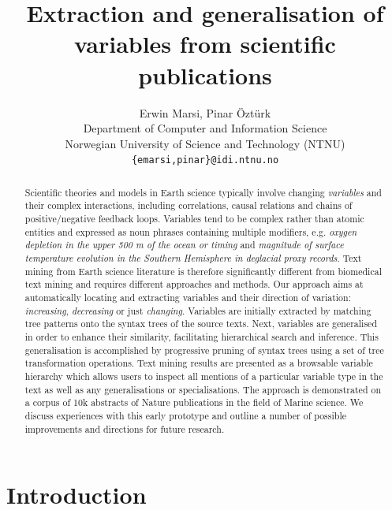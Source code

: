 \documentclass[11pt]{article}
\title{Extraction and generalisation of variables from scientific publications}
\author{Erwin Marsi, Pinar \"Ozt\"urk\\
  Department of Computer and Information Science\\
  Norwegian University of Science and Technology (NTNU)\\
  {\tt \{emarsi,pinar\}@idi.ntnu.no}}
\date{}
\begin{document}
\maketitle

\begin{abstract}

Scientific theories and models in Earth science typically involve changing \emph{variables} and their complex interactions, including correlations, causal relations and chains of positive/negative feedback loops. 
Variables tend to be complex rather than atomic entities and expressed as noun phrases containing multiple modifiers, e.g. \emph{oxygen depletion in the upper 500 m of the ocean or timing} and \emph{magnitude of surface temperature evolution in the Southern Hemisphere in deglacial proxy records}.
Text mining from Earth science literature is therefore significantly different from biomedical text mining and requires different approaches and methods.
Our approach aims at automatically locating and extracting variables and their direction of variation: \emph{increasing}, \emph{decreasing} or just \emph{changing}.
Variables are initially extracted by matching tree patterns onto the syntax trees of the source texts.
Next, variables are generalised in order to enhance their similarity, facilitating hierarchical search and inference.
This generalisation is accomplished by progressive pruning of syntax trees using a set of tree transformation operations.
Text mining results are presented as a browsable variable hierarchy which allows users to inspect all mentions of a particular variable type in the text as well as any generalisations or specialisations.
The approach is demonstrated on a corpus of 10k abstracts of Nature publications in the field of Marine science.
We discuss experiences with this early prototype and outline a number of possible improvements and directions for future research.
\end{abstract}


\section{Introduction}
\end{document}
